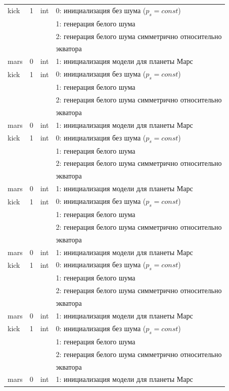 \begin{longtable*}[c]{|l|c|l|l|}
    kick & 1 & int & 0: инициализация без шума (\(p_s = const\)) \\
    &   &     & 1: генерация белого шума                  \\
    &   &     & 2: генерация белого шума симметрично относительно \\
    & & & экватора    \\
    mars & 0 & int & 1: инициализация модели для планеты Марс     \\
    kick & 1 & int & 0: инициализация без шума (\(p_s = const\)) \\
    &   &     & 1: генерация белого шума                  \\
    &   &     & 2: генерация белого шума симметрично относительно \\
    & & & экватора    \\
    mars & 0 & int & 1: инициализация модели для планеты Марс     \\
    kick & 1 & int & 0: инициализация без шума (\(p_s = const\)) \\
    &   &     & 1: генерация белого шума                  \\
    &   &     & 2: генерация белого шума симметрично относительно \\
    & & & экватора    \\
    mars & 0 & int & 1: инициализация модели для планеты Марс     \\
    kick & 1 & int & 0: инициализация без шума (\(p_s = const\)) \\
    &   &     & 1: генерация белого шума                  \\
    &   &     & 2: генерация белого шума симметрично относительно \\
    & & & экватора    \\
    mars & 0 & int & 1: инициализация модели для планеты Марс     \\
    kick & 1 & int & 0: инициализация без шума (\(p_s = const\)) \\
    &   &     & 1: генерация белого шума                  \\
    &   &     & 2: генерация белого шума симметрично относительно \\
    & & & экватора    \\
    mars & 0 & int & 1: инициализация модели для планеты Марс     \\
    kick & 1 & int & 0: инициализация без шума (\(p_s = const\)) \\
    &   &     & 1: генерация белого шума                  \\
    &   &     & 2: генерация белого шума симметрично относительно \\
    & & & экватора    \\
    mars & 0 & int & 1: инициализация модели для планеты Марс     \\
    \hline
\end{longtable*}

